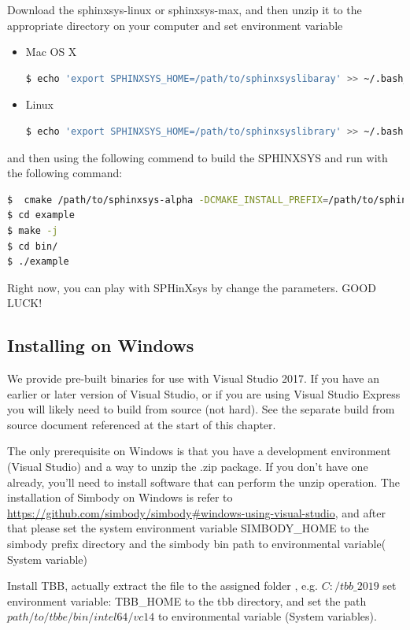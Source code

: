 \documentclass[12pt, a4paper,onecolumn]{article}
\begin{document}
Download the sphinxsys-linux or sphinxsys-max, and then unzip it to the appropriate directory on your computer and set environment variable \begin{itemize}
	\item Mac OS X
\begin{lstlisting}[language=Bash]
$ echo 'export SPHINXSYS_HOME=/path/to/sphinxsyslibaray' >> ~/.bash_profile
\end{lstlisting}
\item  Linux
\begin{lstlisting}[language=Bash]
$ echo 'export SPHINXSYS_HOME=/path/to/sphinxsyslibrary' >> ~/.bashrc
\end{lstlisting}
\end{itemize}
and then using the following commend to build the SPHINXSYS and run with the following command:
\begin{lstlisting}[language=Bash]
$  cmake /path/to/sphinxsys-alpha -DCMAKE_INSTALL_PREFIX=/path/to/sphinxsys-prefix -DCMAKE_BUILD_TYPE=RelWithDebInfo
$ cd example
$ make -j
$ cd bin/
$ ./example
\end{lstlisting}
Right now, you can play with SPHinXsys by change the parameters. GOOD LUCK!
\subsection{Installing on Windows}\label{install-win}
We provide pre-built binaries for use with Visual Studio 2017. 
If you have an earlier or later version of Visual Studio, or if you are using Visual Studio Express you will likely need to build from source (not hard). See the separate build from source document referenced at the start of this chapter.

The only prerequisite on Windows is that you have a development environment (Visual Studio) and a way to unzip the .zip package. If you don’t have one already, you’ll need to install software that can perform the unzip operation. 
The installation of Simbody on Windows is refer to \url{https://github.com/simbody/simbody#windows-using-visual-studio}, 
and after that please set the system environment variable SIMBODY\_HOME to the simbody prefix directory and the simbody bin path  to environmental variable( System variable)

Install TBB, actually extract the file to the assigned folder , e.g. $C:/ tbb\_2019$
set environment variable: TBB\_HOME to the tbb directory, and set the path $path/to/tbbe/bin/intel64/vc14$ to environmental variable (System variables).
\end{document}
